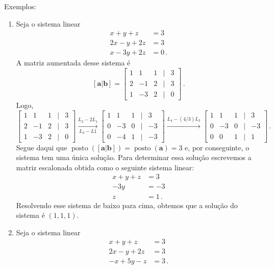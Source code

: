 \documentclass[12pt,a4paper]{report}
\newcommand{\mb}{\mathbf}
\DeclareMathOperator{\posto}{posto}
\begin{document}
Exemplos:
\begin{enumerate}
  \item Seja o sistema linear
  \begin{equation*}
    \begin{split}
      x+y+z&=3\\
      2x-y+2z&=3\\
      x-3y+2z&=0\,.
    \end{split}
  \end{equation*}
  A matriz aumentada desse sistema é
  $$[\mb a|\mb b]=\begin{bmatrix}
    1&1&1&|&3\\
    2&-1&2&|&3\\
    1&-3&2&|&0
  \end{bmatrix}\,.$$
  Logo,
  $$\begin{bmatrix}
    1&1&1&|&3\\
    2&-1&2&|&3\\
    1&-3&2&|&0
  \end{bmatrix}\xrightarrow[L_3-L1]{L_2-2L_1} \begin{bmatrix}
    1&1&1&|&3\\
    0&-3&0&|&-3\\
    0&-4&1&|&-3
  \end{bmatrix}\xrightarrow{L_4-(4/3)L_3} \begin{bmatrix}
    1&1&1&|&3\\
    0&-3&0&|&-3\\
    0&0&1&|&1
  \end{bmatrix}\,.$$
  Segue daqui que $\posto([\mb a|\mb b])=\posto(\mb a)=3$ e, por conseguinte, o sistema tem uma única solução. Para determinar essa solução escrevemos a matriz escalonada obtida como o seguinte sistema linear:
  \begin{equation*}
    \begin{split}
      x+y+z&=3\\
      -3y&=-3\\
      z&=1\,.
    \end{split}
  \end{equation*}
  Resolvendo esse sistema de baixo para cima, obtemos que a solução do sistema é $(1,1,1)$.
  \item Seja o sistema linear
  \begin{equation*}
    \begin{split}
      x+y+z&=3\\
      2x-y+2z&=3\\
      -x+5y-z&=3\,.
    \end{split}

\end{equation*}
\end{enumerate}
\end{document}
